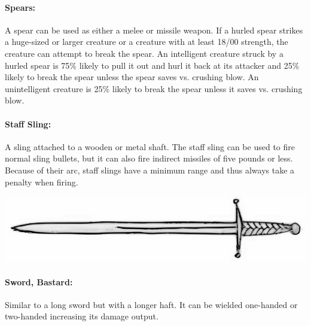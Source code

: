 \begin{multicols}{2}
 
\paragraph{Spears:} A spear can be used as either a melee or missile weapon.  If a hurled spear strikes a huge-sized or larger creature or a creature with at least 18/00 strength, the creature can attempt to break the spear.  An intelligent creature struck by a hurled spear is 75\% likely to pull it out and hurl it back at its attacker and 25\% likely to break the spear unless the spear saves vs. crushing blow.  An unintelligent creature is 25\% likely to break the spear unless it saves vs. crushing blow.  

\paragraph{Staff Sling:}  A sling attached to a wooden or metal shaft.  The staff sling can be used to fire normal sling bullets, but it can also fire indirect missiles of five pounds or less.  Because of their arc, staff slings have a minimum range and thus always take a penalty when firing.

\noindent\includegraphics[width=\columnwidth]{bastardsword.pdf}\label{bastardsword}

\paragraph{Sword, Bastard:} Similar to a long sword but with a longer haft.  It can be wielded one-handed or two-handed increasing its damage output.

\columnbreak

\noindent
\begin{minipage}{\columnwidth}


\end{minipage}
\end{multicols}
